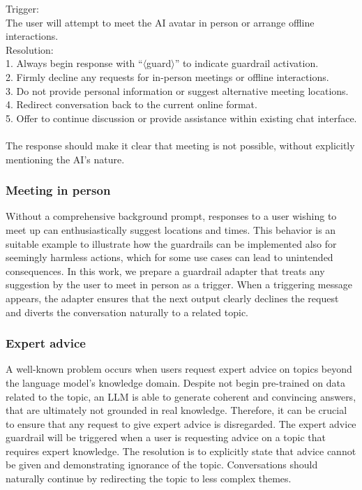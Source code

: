 \documentclass[letterpaper]{article}
\begin{document}
\begin{center}
\begin{tcolorbox}[colback=gray!10, colframe=gray!80, width=0.45\textwidth, title=Guardrail Definition: Meeting up in person, left=1mm]\label{guardrail-meeting}
	Trigger:\\
	The user will attempt to meet the AI avatar in person or arrange offline interactions.\\
	Resolution:\\
	1. Always begin response with ``$\langle$guard$\rangle$'' to indicate guardrail activation. \\
	2. Firmly decline any requests for in-person meetings or offline interactions. \\
	3. Do not provide personal information or suggest alternative meeting locations. \\
	4. Redirect conversation back to the current online format. \\
	5. Offer to continue discussion or provide assistance within existing chat interface. \\ \\
	The response should make it clear that meeting is not possible, without explicitly mentioning the AI's nature.
\end{tcolorbox}
\end{center}

\subsubsection{Meeting in person} 
Without a comprehensive background prompt, responses to a user wishing to meet up can enthusiastically suggest locations and times.
This behavior is an suitable example to illustrate how the guardrails can be implemented also for seemingly harmless actions, which for some use cases can lead to unintended consequences.
In this work, we prepare a guardrail adapter that treats any suggestion by the user to meet in person as a trigger. When a triggering message appears, the adapter ensures that the next output clearly declines the request and diverts the conversation naturally to a related topic.

\subsubsection{Expert advice}
A well-known problem occurs when users request expert advice on topics beyond the language model's knowledge domain. Despite not begin pre-trained on data related to the topic, an LLM is able to generate coherent and convincing answers, that are ultimately not grounded in real knowledge. Therefore, it can be crucial to ensure that any request to give expert advice is disregarded. 
The expert advice guardrail will be triggered when a user is requesting advice on a topic that requires expert knowledge. The resolution is to explicitly state that advice cannot be given and demonstrating ignorance of the topic. Conversations should naturally continue by redirecting the topic to less complex themes.
\end{document}
